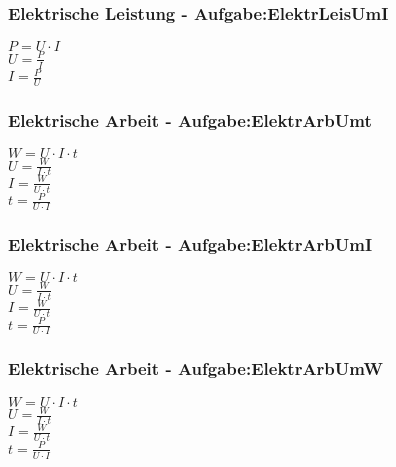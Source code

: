 \subsubsection{Elektrische Leistung - Aufgabe:ElektrLeisUmI} 
\begin{minipage}{0.45\textwidth} 
$ P = U\cdot I $\\ 
$ U = \frac{P}{I} $\\ 
$ I = \frac{P}{U} $\\ 
\end{minipage} 
\begin{minipage}{0.45\textwidth} 
 
\end{minipage} 
\subsubsection{Elektrische Arbeit - Aufgabe:ElektrArbUmt} 
\begin{minipage}{0.45\textwidth} 
$ W = U\cdot I\cdot t $\\ 
$ U = \frac{W}{I\cdot t} $\\ 
$ I = \frac{W}{U\cdot t} $\\ 
$ t = \frac{ P}{U\cdot I} $\\ 
\end{minipage} 
\begin{minipage}{0.45\textwidth} 
 
\end{minipage} 
\subsubsection{Elektrische Arbeit - Aufgabe:ElektrArbUmI} 
\begin{minipage}{0.45\textwidth} 
$ W = U\cdot I\cdot t $\\ 
$ U = \frac{W}{I\cdot t} $\\ 
$ I = \frac{W}{U\cdot t} $\\ 
$ t = \frac{ P}{U\cdot I} $\\ 
\end{minipage} 
\begin{minipage}{0.45\textwidth} 
 
\end{minipage} 
\subsubsection{Elektrische Arbeit - Aufgabe:ElektrArbUmW} 
\begin{minipage}{0.45\textwidth} 
$ W = U\cdot I\cdot t $\\ 
$ U = \frac{W}{I\cdot t} $\\ 
$ I = \frac{W}{U\cdot t} $\\ 
$ t = \frac{ P}{U\cdot I} $\\ 
\end{minipage} 
\begin{minipage}{0.45\textwidth} 
 
\end{minipage} 
